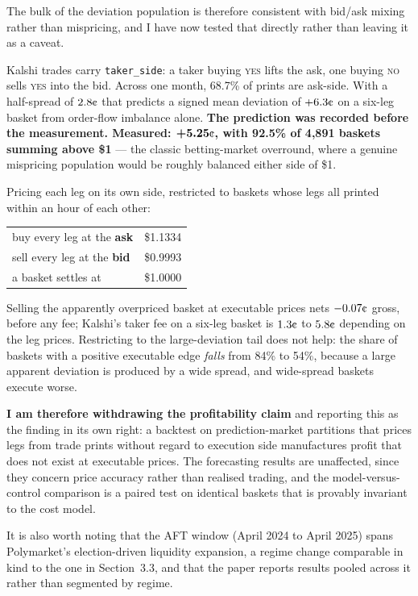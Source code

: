 \documentclass[11pt,a4paper]{article}
\newcommand{\cent}{\text{\textcent}}
\begin{document}
The bulk of the deviation population is therefore consistent with bid/ask
mixing rather than mispricing, and I have now tested that directly rather
than leaving it as a caveat.

Kalshi trades carry \texttt{taker\_side}: a taker buying \textsc{yes} lifts
the ask, one buying \textsc{no} sells \textsc{yes} into the bid. Across one
month, 68.7\% of prints are ask-side. With a half-spread of $2.8\cent$ that
predicts a signed mean deviation of $+6.3\cent$ on a six-leg basket from
order-flow imbalance alone. \textbf{The prediction was recorded before the
measurement. Measured: $\bm{+5.25\cent}$, with 92.5\% of 4{,}891 baskets
summing above \$1} --- the classic betting-market overround, where a genuine
mispricing population would be roughly balanced either side of \$1.

Pricing each leg on its own side, restricted to baskets whose legs all
printed within an hour of each other:

\begin{center}\small
\begin{tabular}{lr}
\toprule
buy every leg at the \textbf{ask} & \$1.1334 \\
sell every leg at the \textbf{bid} & \$0.9993 \\
a basket settles at & \$1.0000 \\
\bottomrule
\end{tabular}
\end{center}

\noindent Selling the apparently overpriced basket at executable prices nets
$-0.07\cent$ gross, before any fee; Kalshi's taker fee on a six-leg basket is
$1.3\cent$ to $5.8\cent$ depending on the leg prices. Restricting to the
large-deviation tail does not help: the share of baskets with a positive
executable edge \emph{falls} from 84\% to 54\%, because a large apparent
deviation is produced by a wide spread, and wide-spread baskets execute
worse.

\textbf{I am therefore withdrawing the profitability claim} and reporting
this as the finding in its own right: a backtest on prediction-market
partitions that prices legs from trade prints without regard to execution
side manufactures profit that does not exist at executable prices. The
forecasting results are unaffected, since they concern price accuracy rather
than realised trading, and the model-versus-control comparison is a paired
test on identical baskets that is provably invariant to the cost model.

It is also worth noting that the AFT window (April 2024 to April 2025) spans
Polymarket's election-driven liquidity expansion, a regime change comparable
in kind to the one in Section~3.3, and that the paper reports results pooled
across it rather than segmented by regime.
\end{document}
